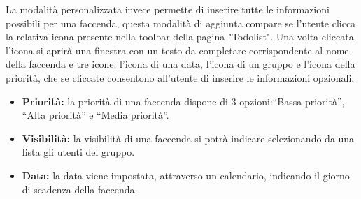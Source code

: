 La modalità personalizzata invece permette di inserire tutte le informazioni possibili per una faccenda, questa modalità di aggiunta compare se l'utente clicca la relativa icona presente nella toolbar della pagina "Todolist". Una volta cliccata l'icona si aprirà una finestra con un testo da completare corrispondente al nome della faccenda e tre icone: l'icona di una data, l'icona di un gruppo e l'icona della priorità, che se cliccate consentono all'utente di inserire le informazioni opzionali.
\begin{itemize}
    \item \textbf{Priorità:} la priorità di una faccenda dispone di 3 opzioni:``Bassa priorità'', ``Alta priorità'' e ``Media priorità''.
    \item \textbf{Visibilità:} la visibilità di una faccenda si potrà indicare selezionando da una lista gli utenti del gruppo.
    \item \textbf{Data:} la data viene impostata, attraverso un calendario, indicando il giorno di scadenza della faccenda.
\end{itemize}




